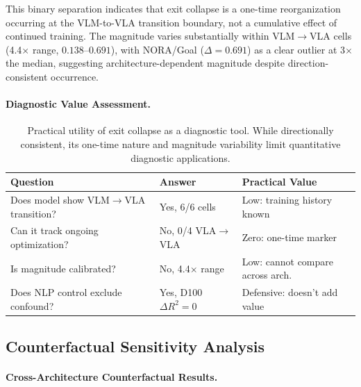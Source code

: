 \documentclass[letterpaper]{article}
\begin{document}
This binary separation indicates that exit collapse is a one-time reorganization occurring at the VLM-to-VLA transition boundary, not a cumulative effect of continued training. The magnitude varies substantially within VLM$\to$VLA cells (4.4$\times$ range, $0.138$--$0.691$), with NORA/Goal ($\Delta = 0.691$) as a clear outlier at 3$\times$ the median, suggesting architecture-dependent magnitude despite direction-consistent occurrence.

\paragraph{Diagnostic Value Assessment.}

\begin{table}[h]
\centering
\caption{Practical utility of exit collapse as a diagnostic tool. While directionally consistent, its one-time nature and magnitude variability limit quantitative diagnostic applications.}
\label{tab:diagnostic_value}
\begin{tabular}{lll}
\toprule
Question & Answer & Practical Value \\
\midrule
Does model show VLM$\to$VLA transition? & Yes, 6/6 cells & Low: training history known \\
Can it track ongoing optimization? & No, 0/4 VLA$\to$VLA & Zero: one-time marker \\
Is magnitude calibrated? & No, 4.4$\times$ range & Low: cannot compare across arch. \\
Does NLP control exclude confound? & Yes, D100 $\Delta R^2 = 0$ & Defensive: doesn't add value \\
\bottomrule
\end{tabular}
\end{table}

\subsection{Counterfactual Sensitivity Analysis}
\label{sec:cf_sensitivity}

\paragraph{Cross-Architecture Counterfactual Results.}
\end{document}
